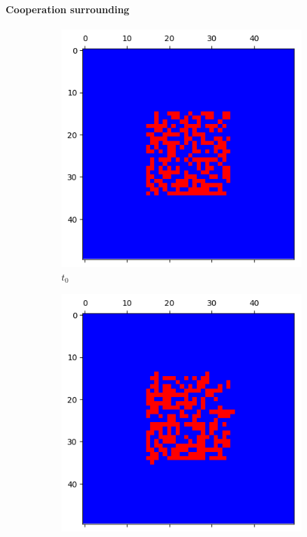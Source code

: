 \documentclass[letterpaper]{article}
\begin{document}
\paragraph{Cooperation surrounding}

\begin{figure}[H]
    \begin{subfigure}{.33\textwidth}
      \centering
      \includegraphics[width=1\linewidth]{images/assign2/part32-coop/t0}
      \caption{$t_{0}$}
    \end{subfigure}
    \begin{subfigure}{.33\textwidth}
      \centering
      \includegraphics[width=1\linewidth]{images/assign2/part32-coop/t1}

\end{subfigure}
\end{figure}
\end{document}
